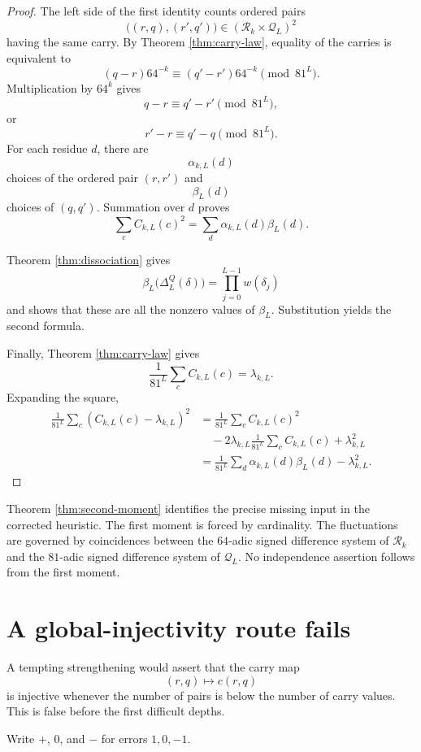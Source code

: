 \documentclass[11pt]{article}
\theoremstyle{remark}
\newcommand{\Rset}{\mathcal{R}}
\newcommand{\Qset}{\mathcal{Q}}
\begin{document}
\begin{proof}
The left side of the first identity counts ordered pairs
\[
\bigl((r,q),(r',q')\bigr)
\in
(\Rset_k\times\Qset_L)^2
\]
having the same carry.  By Theorem \ref{thm:carry-law}, equality of the carries is equivalent to
\[
(q-r)64^{-k}
\equiv
(q'-r')64^{-k}
\pmod{81^L}.
\]
Multiplication by \(64^k\) gives
\[
q-r\equiv q'-r'\pmod{81^L},
\]
or
\[
r'-r\equiv q'-q\pmod{81^L}.
\]
For each residue \(d\), there are
\[
\alpha_{k,L}(d)
\]
choices of the ordered pair \((r,r')\) and
\[
\beta_L(d)
\]
choices of \((q,q')\).  Summation over \(d\) proves
\[
\sum_cC_{k,L}(c)^2
=
\sum_d\alpha_{k,L}(d)\beta_L(d).
\]

Theorem \ref{thm:dissociation} gives
\[
\beta_L\bigl(\Delta_L^Q(\delta)\bigr)
=
\prod_{j=0}^{L-1}w(\delta_j)
\]
and shows that these are all the nonzero values of \(\beta_L\).  Substitution yields the second formula.

Finally, Theorem \ref{thm:carry-law} gives
\[
\frac1{81^L}\sum_cC_{k,L}(c)
=
\lambda_{k,L}.
\]
Expanding the square,
\begin{align*}
\frac1{81^L}\sum_c(C_{k,L}(c)-\lambda_{k,L})^2
&=
\frac1{81^L}\sum_cC_{k,L}(c)^2\\
&\quad
-
2\lambda_{k,L}
\frac1{81^L}\sum_cC_{k,L}(c)
+
\lambda_{k,L}^2\\
&=
\frac1{81^L}\sum_d\alpha_{k,L}(d)\beta_L(d)
-
\lambda_{k,L}^2.
\end{align*}
\end{proof}

Theorem \ref{thm:second-moment} identifies the precise missing input in the corrected heuristic.  The first moment is forced by cardinality.  The fluctuations are governed by coincidences between the \(64\)-adic signed difference system of \(\Rset_k\) and the \(81\)-adic signed difference system of \(\Qset_L\).  No independence assertion follows from the first moment.

\section{A global-injectivity route fails}

A tempting strengthening would assert that the carry map
\[
(r,q)\longmapsto c(r,q)
\]
is injective whenever the number of pairs is below the number of carry values.  This is false before the first difficult depths.

Write \(+\), \(0\), and \(-\) for errors \(1,0,-1\).
\end{document}
